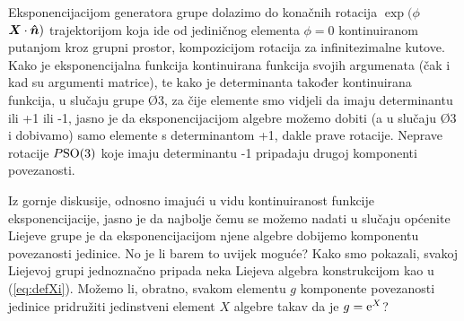 Eksponencijacijom generatora grupe  dolazimo do konačnih rotacija
$\exp(\phi$ $\vec{X}\cdot\unitn)$ trajektorijom koja ide od jediničnog
elementa $\phi=0$ kontinuiranom putanjom kroz grupni prostor, kompozicijom rotacija za
infinitezimalne kutove. Kako je eksponencijalna funkcija kontinuirana
funkcija svojih argumenata (čak i kad su argumenti matrice), te kako
je determinanta također kontinuirana funkcija, u slučaju grupe \O{3},
za čije elemente smo vidjeli da imaju determinantu ili +1 ili -1,
jasno je da eksponencijacijom algebre možemo dobiti (a u slučaju \O{3}
i dobivamo) samo elemente s determinantom +1, dakle prave rotacije.
Neprave rotacije $P\mathrm{SO}(3)$ koje imaju determinantu -1
pripadaju drugoj komponenti povezanosti. \label{pag:povezanostO3}



Iz gornje diskusije, odnosno imajući u vidu kontinuiranost funkcije
eksponencijacije, jasno je da najbolje čemu se možemo nadati u
slučaju općenite Liejeve grupe je da
eksponencijacijom njene algebre dobijemo komponentu povezanosti
jedinice. No je li barem to uvijek moguće?
Kako smo pokazali, svakoj Liejevoj grupi jednoznačno pripada neka Liejeva algebra
konstrukcijom kao u (\ref{eq:defXi}). Možemo li, obratno, svakom
elementu $g$  komponente povezanosti jedinice pridružiti jedinstveni
element $X$ algebre takav da je $g = \textrm{e}^{X}$?

